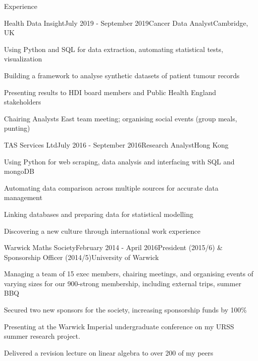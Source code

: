 \documentclass{resume} %
\begin{document}
\begin{rSection}{Experience}

\begin{rSubsection}{Health Data Insight}{July 2019 - September 2019}{Cancer Data Analyst}{Cambridge, UK}
\item Using Python and SQL for data extraction, automating statistical tests, visualization
\item Building a framework to analyse synthetic datasets of patient tumour records
\item Presenting results to HDI board members and Public Health England stakeholders
\item Chairing Analysts East team meeting; organising social events (group meals, punting)
\end{rSubsection}


\begin{rSubsection}{TAS Services Ltd}{July 2016 - September 2016}{Research Analyst}{Hong Kong}
\item Using Python for web scraping, data analysis and interfacing with SQL and mongoDB
\item Automating data comparison across multiple sources for accurate data management
\item Linking databases and preparing data for statistical modelling
\item Discovering a new culture through international work experience
\end{rSubsection}


\begin{rSubsection}{Warwick Maths Society}{February 2014 - April 2016}{President (2015/6) \& Sponsorship Officer (2014/5)}{University of Warwick}
\item Managing a team of 15 exec members, chairing meetings, and organising events of varying sizes for our 900-strong membership, including external trips, summer BBQ
\item Secured two new sponsors for the society, increasing sponsorship funds by 100\%
\item Presenting at the Warwick Imperial undergraduate conference on my URSS summer research project.
\item Delivered a revision lecture on linear algebra to over 200 of my peers
\end{rSubsection}

\end{rSection}
\end{document}

